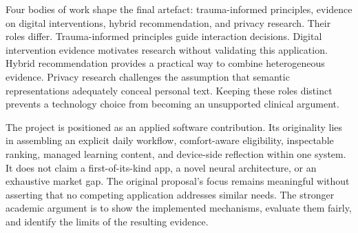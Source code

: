 Four bodies of work shape the final artefact: trauma-informed principles, evidence on digital interventions, hybrid recommendation, and privacy research. Their roles differ. Trauma-informed principles guide interaction decisions. Digital intervention evidence motivates research without validating this application. Hybrid recommendation provides a practical way to combine heterogeneous evidence. Privacy research challenges the assumption that semantic representations adequately conceal personal text. Keeping these roles distinct prevents a technology choice from becoming an unsupported clinical argument.

The project is positioned as an applied software contribution. Its originality lies in assembling an explicit daily workflow, comfort-aware eligibility, inspectable ranking, managed learning content, and device-side reflection within one system. It does not claim a first-of-its-kind app, a novel neural architecture, or an exhaustive market gap. The original proposal's focus remains meaningful without asserting that no competing application addresses similar needs. The stronger academic argument is to show the implemented mechanisms, evaluate them fairly, and identify the limits of the resulting evidence.
